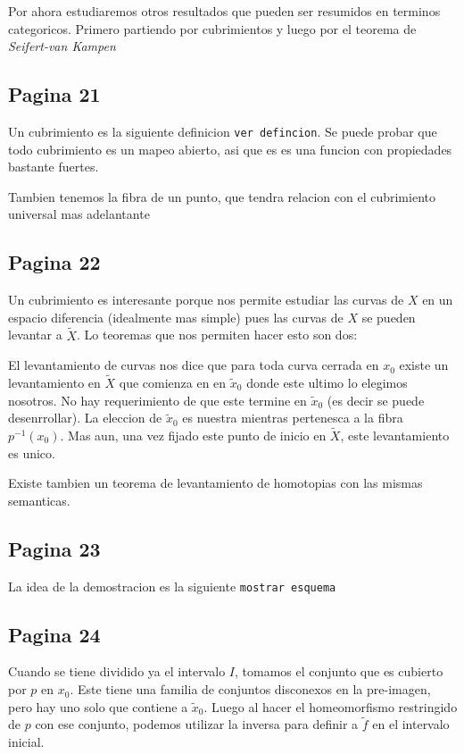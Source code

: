 \documentclass[letterpaper]{article}
\newcommand{\vank}{\emph{Seifert-van Kampen} }
\begin{document}
Por ahora estudiaremos otros resultados que pueden ser resumidos en
terminos categoricos. Primero partiendo por cubrimientos y luego por el
teorema de \vank

\subsection*{Pagina 21}
Un cubrimiento es la siguiente definicion \texttt{ver defincion}. Se
puede probar que todo cubrimiento es un mapeo abierto, asi que es es una
funcion con propiedades bastante fuertes.

Tambien tenemos la fibra de un punto, que tendra relacion con el
cubrimiento universal mas adelantante

\subsection*{Pagina 22}
Un cubrimiento es interesante porque nos permite estudiar las curvas de
\(X\) en un espacio diferencia (idealmente mas simple) pues las curvas
de \(X\) se pueden levantar a \(\tilde X\). Lo teoremas que nos permiten
hacer esto son dos:

El levantamiento de curvas nos dice que para toda curva cerrada en
\(x_0\) existe un levantamiento en \(\tilde X\) que comienza en en
\(\tilde x_0\) donde este ultimo lo elegimos nosotros. No hay
requerimiento de que este termine en \(\tilde x_0\) (es decir se puede
desenrrollar). La eleccion de \(\tilde x_0\) es nuestra mientras
pertenesca a la fibra \(p^{-1} (x_0)\). Mas aun, una vez fijado este
punto de inicio en \(\tilde X\), este levantamiento es unico.

Existe tambien un teorema de levantamiento de homotopias con las mismas
semanticas.

\subsection*{Pagina 23}
La idea de la demostracion es la siguiente \texttt{mostrar esquema}

\subsection*{Pagina 24}
Cuando se tiene dividido ya el intervalo \(I\), tomamos el conjunto que
es cubierto por \(p\) en \(x_0\). Este tiene una familia de conjuntos
disconexos en la pre-imagen, pero hay uno solo que contiene a \(\tilde
x_0\). Luego al hacer el homeomorfismo restringido de \(p\) con ese
conjunto, podemos utilizar la inversa para definir a \(\tilde f\) en el
intervalo inicial.
\end{document}
